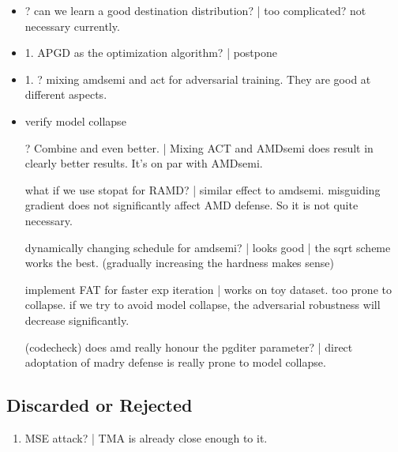 \begin{itemize}
	\item ? can we learn a good destination distribution? | too
		complicated? not necessary currently.

	\item 1. APGD as the optimization algorithm? | postpone

	\item 1. ? mixing amdsemi and act for adversarial training. They are good
		at different aspects.

	\item verify model collapse

	\item [?] Combine and even better. | Mixing ACT and AMDsemi does result
		in clearly better results. It's on par with AMDsemi.

	\item [\cmark] what if we use stopat for RAMD? | similar effect to amdsemi.
		misguiding gradient does not significantly affect AMD defense. So it
		is not quite necessary.
	
	\item [\cmark] \checkmark dynamically changing schedule for amdsemi? |
		looks good | the sqrt scheme works the best. (gradually increasing the
		hardness makes sense)

	\item [\cmark] implement FAT for faster exp iteration | works on toy
		dataset. too prone to collapse. if we try to avoid model collapse, the
		adversarial robustness will decrease significantly.

	\item [\cmark] (codecheck) does amd really honour the pgditer parameter? |
		direct adoptation of madry defense is really prone to model collapse.

\end{itemize}


\subsection{Discarded or Rejected}

\begin{enumerate}

	\item \xmark
		MSE attack? | TMA is already close enough to it.

\end{enumerate}
